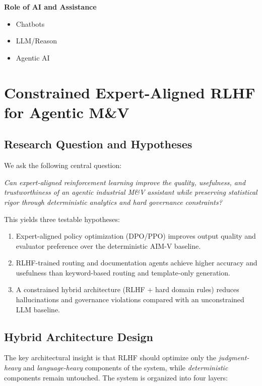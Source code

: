 \documentclass[11pt,a4paper]{article}
\begin{document}
\textbf{Role of AI and Assistance}

\begin{itemize}
    \item Chatbots
    \item LLM/Reason
    \item Agentic AI
\end{itemize}

\section{Constrained Expert-Aligned RLHF for Agentic M\&V}

\subsection{Research Question and Hypotheses}

We ask the following central question:

\textit{Can expert-aligned reinforcement learning improve the quality, usefulness, and trustworthiness of an agentic industrial M\&V assistant while preserving statistical rigor through deterministic analytics and hard governance constraints?}

\noindent This yields three testable hypotheses:
\begin{enumerate}
    \item[\textbf{H1}] Expert-aligned policy optimization (DPO/PPO) improves output quality and evaluator preference over the deterministic AIM-V baseline.
    \item[\textbf{H2}] RLHF-trained routing and documentation agents achieve higher accuracy and usefulness than keyword-based routing and template-only generation.
    \item[\textbf{H3}] A constrained hybrid architecture (RLHF + hard domain rules) reduces hallucinations and governance violations compared with an unconstrained LLM baseline.
\end{enumerate}

\subsection{Hybrid Architecture Design}

The key architectural insight is that RLHF should optimize only the \emph{judgment-heavy} and \emph{language-heavy} components of the system, while \emph{deterministic} components remain untouched. The system is organized into four layers:
\end{document}
